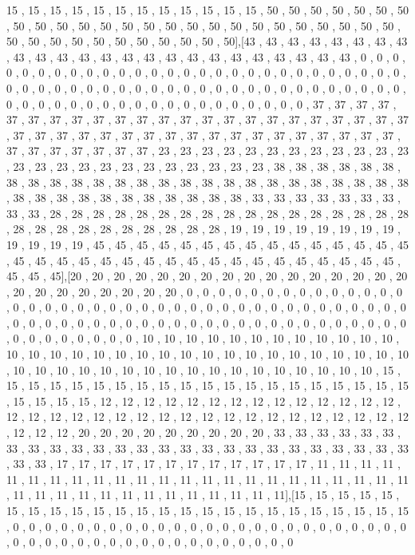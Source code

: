 \begin{DoxyCompactItemize}
15 , 15 , 15 , 15 , 15 , 15 , 15 , 15 , 15 , 15 , 15 , 15 , 50 , 50 , 50 , 50 , 50 , 50 , 50 , 50 , 50 , 50 , 50 , 50 , 50 , 50 , 50 , 50 , 50 , 50 , 50 , 50 , 50 , 50 , 50 , 50 , 50 , 50 , 50 , 50 , 50 , 50 , 50 , 50 , 50 , 50 , 50 , 50\mbox{]},\mbox{[}43 , 43 , 43 , 43 , 43 , 43 , 43 , 43 , 43 , 43 , 43 , 43 , 43 , 43 , 43 , 43 , 43 , 43 , 43 , 43 , 43 , 43 , 43 , 43 , 0 , 0 , 0 , 0 , 0 , 0 , 0 , 0 , 0 , 0 , 0 , 0 , 0 , 0 , 0 , 0 , 0 , 0 , 0 , 0 , 0 , 0 , 0 , 0 , 0 , 0 , 0 , 0 , 0 , 0 , 0 , 0 , 0 , 0 , 0 , 0 , 0 , 0 , 0 , 0 , 0 , 0 , 0 , 0 , 0 , 0 , 0 , 0 , 0 , 0 , 0 , 0 , 0 , 0 , 0 , 0 , 0 , 0 , 0 , 0 , 0 , 0 , 0 , 0 , 0 , 0 , 0 , 0 , 0 , 0 , 0 , 0 , 37 , 37 , 37 , 37 , 37 , 37 , 37 , 37 , 37 , 37 , 37 , 37 , 37 , 37 , 37 , 37 , 37 , 37 , 37 , 37 , 37 , 37 , 37 , 37 , 37 , 37 , 37 , 37 , 37 , 37 , 37 , 37 , 37 , 37 , 37 , 37 , 37 , 37 , 37 , 37 , 37 , 37 , 37 , 37 , 37 , 37 , 37 , 37 , 23 , 23 , 23 , 23 , 23 , 23 , 23 , 23 , 23 , 23 , 23 , 23 , 23 , 23 , 23 , 23 , 23 , 23 , 23 , 23 , 23 , 23 , 23 , 23 , 38 , 38 , 38 , 38 , 38 , 38 , 38 , 38 , 38 , 38 , 38 , 38 , 38 , 38 , 38 , 38 , 38 , 38 , 38 , 38 , 38 , 38 , 38 , 38 , 38 , 38 , 38 , 38 , 38 , 38 , 38 , 38 , 38 , 38 , 38 , 38 , 33 , 33 , 33 , 33 , 33 , 33 , 33 , 33 , 33 , 28 , 28 , 28 , 28 , 28 , 28 , 28 , 28 , 28 , 28 , 28 , 28 , 28 , 28 , 28 , 28 , 28 , 28 , 28 , 28 , 28 , 28 , 28 , 28 , 28 , 28 , 28 , 19 , 19 , 19 , 19 , 19 , 19 , 19 , 19 , 19 , 19 , 19 , 19 , 45 , 45 , 45 , 45 , 45 , 45 , 45 , 45 , 45 , 45 , 45 , 45 , 45 , 45 , 45 , 45 , 45 , 45 , 45 , 45 , 45 , 45 , 45 , 45 , 45 , 45 , 45 , 45 , 45 , 45 , 45 , 45 , 45 , 45 , 45 , 45\mbox{]},\mbox{[}20 , 20 , 20 , 20 , 20 , 20 , 20 , 20 , 20 , 20 , 20 , 20 , 20 , 20 , 20 , 20 , 20 , 20 , 20 , 20 , 20 , 20 , 20 , 20 , 0 , 0 , 0 , 0 , 0 , 0 , 0 , 0 , 0 , 0 , 0 , 0 , 0 , 0 , 0 , 0 , 0 , 0 , 0 , 0 , 0 , 0 , 0 , 0 , 0 , 0 , 0 , 0 , 0 , 0 , 0 , 0 , 0 , 0 , 0 , 0 , 0 , 0 , 0 , 0 , 0 , 0 , 0 , 0 , 0 , 0 , 0 , 0 , 0 , 0 , 0 , 0 , 0 , 0 , 0 , 0 , 0 , 0 , 0 , 0 , 0 , 0 , 0 , 0 , 0 , 0 , 0 , 0 , 0 , 0 , 0 , 0 , 10 , 10 , 10 , 10 , 10 , 10 , 10 , 10 , 10 , 10 , 10 , 10 , 10 , 10 , 10 , 10 , 10 , 10 , 10 , 10 , 10 , 10 , 10 , 10 , 10 , 10 , 10 , 10 , 10 , 10 , 10 , 10 , 10 , 10 , 10 , 10 , 10 , 10 , 10 , 10 , 10 , 10 , 10 , 10 , 10 , 10 , 10 , 10 , 15 , 15 , 15 , 15 , 15 , 15 , 15 , 15 , 15 , 15 , 15 , 15 , 15 , 15 , 15 , 15 , 15 , 15 , 15 , 15 , 15 , 15 , 15 , 15 , 12 , 12 , 12 , 12 , 12 , 12 , 12 , 12 , 12 , 12 , 12 , 12 , 12 , 12 , 12 , 12 , 12 , 12 , 12 , 12 , 12 , 12 , 12 , 12 , 12 , 12 , 12 , 12 , 12 , 12 , 12 , 12 , 12 , 12 , 12 , 12 , 20 , 20 , 20 , 20 , 20 , 20 , 20 , 20 , 20 , 33 , 33 , 33 , 33 , 33 , 33 , 33 , 33 , 33 , 33 , 33 , 33 , 33 , 33 , 33 , 33 , 33 , 33 , 33 , 33 , 33 , 33 , 33 , 33 , 33 , 33 , 33 , 17 , 17 , 17 , 17 , 17 , 17 , 17 , 17 , 17 , 17 , 17 , 17 , 11 , 11 , 11 , 11 , 11 , 11 , 11 , 11 , 11 , 11 , 11 , 11 , 11 , 11 , 11 , 11 , 11 , 11 , 11 , 11 , 11 , 11 , 11 , 11 , 11 , 11 , 11 , 11 , 11 , 11 , 11 , 11 , 11 , 11 , 11 , 11\mbox{]},\mbox{[}15 , 15 , 15 , 15 , 15 , 15 , 15 , 15 , 15 , 15 , 15 , 15 , 15 , 15 , 15 , 15 , 15 , 15 , 15 , 15 , 15 , 15 , 15 , 15 , 0 , 0 , 0 , 0 , 0 , 0 , 0 , 0 , 0 , 0 , 0 , 0 , 0 , 0 , 0 , 0 , 0 , 0 , 0 , 0 , 0 , 0 , 0 , 0 , 0 , 0 , 0 , 0 , 0 , 0 , 0 , 0 , 0 , 0 , 0 , 0 , 0 , 0 , 0 , 0 , 0 , 0 , 0 
\end{DoxyCompactItemize}
